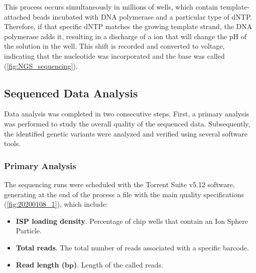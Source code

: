 This process occurs simultaneously in millions of wells, which contain template-attached beads incubated with DNA polymerase and a particular type of dNTP. Therefore, if that specific dNTP matches the growing template strand, the DNA polymerase adds it, resulting in a discharge of a  ion that will change the pH of the solution in the well. This shift is recorded and converted to voltage, indicating that the nucleotide was incorporated and the base was called (\autoref{fig:NGS_sequencing}).

\subsection{Sequenced Data Analysis}

Data analysis was completed in two consecutive steps. First, a primary analysis was performed to study the overall quality of the sequenced data. Subsequently, the identified genetic variants were analyzed and verified using several software tools.

\subsubsection{Primary Analysis}

The sequencing runs were scheduled with the Torrent Suite\texttrademark{} v5.12 software, generating at the end of the process a file with the main quality specifications (\autoref{fig:20200108_1}), which include:
\begin{itemize}
    \item \textbf{ISP loading density}. Percentage of chip wells that contain an Ion Sphere\texttrademark{} Particle.
    \item \textbf{Total reads}. The total number of reads associated with a specific barcode.
    \item \textbf{Read length ($\boldsymbol{bp}$)}. Length of the called reads.
\end{itemize}

